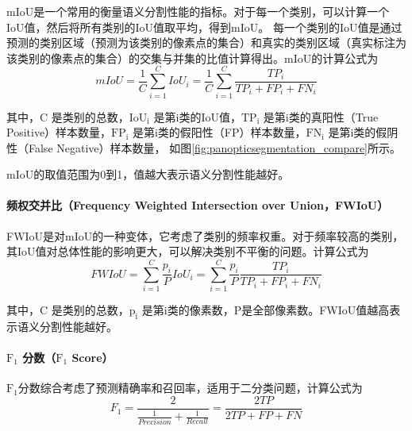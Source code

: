 \par mIoU是一个常用的衡量语义分割性能的指标。对于每一个类别，可以计算一个IoU值，然后将所有类别的IoU值取平均，得到mIoU。
每一个类别的IoU值是通过预测的类别区域（预测为该类别的像素点的集合）和真实的类别区域（真实标注为该类别的像素点的集合）的交集与并集的比值计算得出。mIoU的计算公式为
\begin{equation}
	mIoU = \frac{1}{C} \sum_{i=1}^{C}IoU_i = \frac{1}{C} \sum_{i=1}^{C}\frac{TP_i}{TP_i + FP_i + FN_i}
	\label{miou}
\end{equation}

\par 其中，C 是类别的总数，$\text{IoU}_\text{i}$ 是第i类的IoU值，$\text{TP}_\text{i}$ 是第i类的真阳性（True Positive）样本数量，$\text{FP}_\text{i}$ 是第i类的假阳性（FP）样本数量，$\text{FN}_\text{i}$ 是第i类的假阴性（False Negative）样本数量，
如图\ref{fig:panopticsegmentation_compare}\cite{panopticsegmentation}所示。

\par mIoU的取值范围为0到1，值越大表示语义分割性能越好。

\paragraph{频权交并比（Frequency Weighted Intersection over Union，FWIoU）}
\par FWIoU是对mIoU的一种变体，它考虑了类别的频率权重。对于频率较高的类别，其IoU值对总体性能的影响更大，可以解决类别不平衡的问题。计算公式为
\begin{equation}
	FWIoU = \sum_{i=1}^{C} \frac{p_i}{P} IoU_i = \sum_{i=1}^{C} \frac{p_i}{P} \frac{TP_i}{TP_i + FP_i + FN_i}
	\label{fwiou}
\end{equation}

\par 其中，C 是类别的总数，$\text{p}_\text{i}$ 是第i类的像素数，P是全部像素数。FWIoU值越高表示语义分割性能越好。

\paragraph{$\text{F}_\text{1}$ 分数（$\text{F}_\text{1}$ Score）}
\par $\text{F}_\text{1}$分数综合考虑了预测精确率和召回率，适用于二分类问题，计算公式为
\begin{equation}
	F_{1} = \frac{2}{\frac{1}{Precision} + \frac{1}{Recall}} = \frac{2TP}{2TP+FP+FN}
	\label{f1score}
\end{equation}

